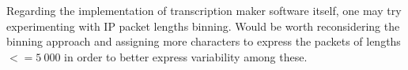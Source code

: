 \documentclass{article}
\begin{document}
Regarding the implementation of transcription maker software itself, one may try experimenting with IP packet lengths binning. Would be worth reconsidering the binning approach and assigning more characters to express the packets of lengths $<= 5\ 000$ in order to better express variability among these.


\clearpage




% 







\end{document}
